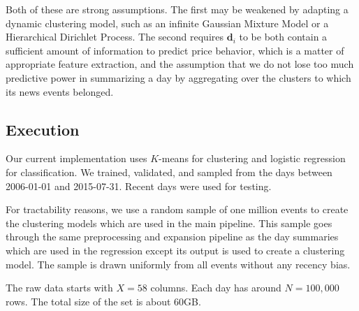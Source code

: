 Both of these are strong assumptions. The first may be weakened by adapting a dynamic clustering model, such as an infinite Gaussian Mixture Model or a Hierarchical Dirichlet Process. The second requires $\textbf{d}_i$ to be both contain a sufficient amount of information to predict price behavior, which is a matter of appropriate feature extraction, and the assumption that we do not lose too much predictive power in summarizing a day by aggregating over the clusters to which its news events belonged.

\subsection{Execution}

Our current implementation uses $K$-means for clustering and logistic regression for classification. We trained, validated, and sampled from the days between 2006-01-01 and 2015-07-31. Recent days were used for testing.

For tractability reasons, we use a random sample of one million events to create the clustering models which are used in the main pipeline. This sample goes through the same preprocessing and expansion pipeline as the day summaries which are used in the regression except its output is used to create a clustering model. The sample is drawn uniformly from all events without any recency bias.

The raw data starts with $X=58$ columns. Each day has around $N=100,000$ rows. The total size of the set is about 60GB. %

